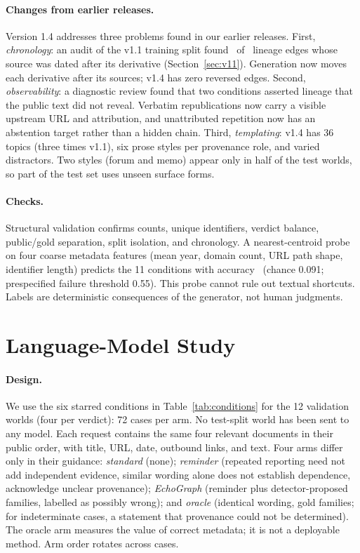 \documentclass[11pt]{article}
\begin{document}
\paragraph{Changes from earlier releases.}
Version 1.4 addresses three problems found in our earlier releases. First, \emph{chronology}: an
audit of the v1.1 training split found \ChronReversed\ of \ChronEdges\ lineage edges whose source
was dated after its derivative (Section~\ref{sec:v11}). Generation now moves each derivative after
its sources; v1.4 has zero reversed edges. Second, \emph{observability}: a diagnostic review found
that two conditions asserted lineage that the public text did not reveal. Verbatim republications
now carry a visible upstream URL and attribution, and unattributed repetition now has an abstention
target rather than a hidden chain. Third, \emph{templating}: v1.4 has 36 topics (three times v1.1),
six prose styles per provenance role, and varied distractors. Two styles (forum and memo) appear
only in half of the test worlds, so part of the test set uses unseen surface forms.

\paragraph{Checks.}
Structural validation confirms counts, unique identifiers, verdict balance, public/gold separation,
split isolation, and chronology. A nearest-centroid probe on four coarse metadata features (mean
year, domain count, URL path shape, identifier length) predicts the 11 conditions with accuracy
\ProbeAccFour\ (chance 0.091; prespecified failure threshold 0.55). This probe cannot rule out
textual shortcuts. Labels are deterministic consequences of the generator, not human judgments.

\section{Language-Model Study}
\paragraph{Design.}
We use the six starred conditions in Table~\ref{tab:conditions} for the 12 validation worlds
(four per verdict): 72 cases per arm. No test-split world has been sent to any model. Each request contains the same four relevant documents in their public order, with title, URL,
date, outbound links, and text. Four arms differ only in their guidance:
\emph{standard} (none); \emph{reminder} (repeated reporting need not add independent evidence,
similar wording alone does not establish dependence, acknowledge unclear provenance);
\emph{EchoGraph} (reminder plus detector-proposed families, labelled as possibly wrong); and
\emph{oracle} (identical wording, gold families; for indeterminate cases, a statement that
provenance could not be determined). The oracle arm measures the value of correct metadata; it is
not a deployable method. Arm order rotates across cases.
\end{document}
